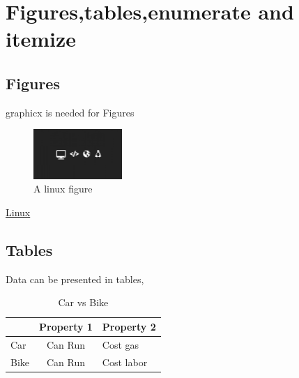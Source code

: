 \chapter{Figures,tables,enumerate and itemize}

\section{Figures}
graphicx is needed for Figures
\begin{figure}[!h]
    \centering
    \includegraphics[width=0.3\textwidth]{chapters/chapter2/theWorldIsLinux.jpg}
    \caption{A linux figure}
    \label{linux}
\end{figure}


\newpage

\hyperref[linux]{Linux}

\section{Tables}
Data can be presented in tables,

\begin{table}[!h]
    \centering%
    \begin{tabular}{l|cl}
        \hline  %
        \hline
         & Property 1 & Property 2\\
        \hline
    Car  & Can Run      & Cost gas\\
    Bike & Can Run      & Cost labor\\
        \hline
        \hline
    \end{tabular}
    \caption{Car vs Bike}
    \label{Figure_CarvsBike}
\end{table}

